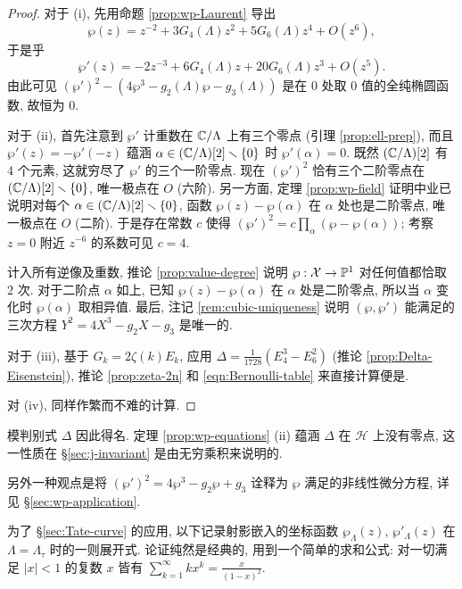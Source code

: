 \begin{proof}
	对于 (i), 先用命题 \ref{prop:wp-Laurent} 导出
	\[ \wp(z) = z^{-2} + 3G_4(\Lambda) z^2 + 5G_6(\Lambda) z^4 + O(z^6), \]
	于是乎
	\[ \wp'(z) = -2z^{-3} + 6 G_4(\Lambda) z + 20 G_6(\Lambda) z^3 + O(z^5). \]
	由此可见 $(\wp')^2 - (4\wp^3 - g_2(\Lambda) \wp - g_3(\Lambda))$ 是在 $0$ 处取 $0$ 值的全纯椭圆函数, 故恒为 $0$.

	对于 (ii), 首先注意到 $\wp'$ 计重数在 $\mathbb{C}/\Lambda$ 上有三个零点 (引理 \ref{prop:ell-prep}), 而且 $\wp'(z) = -\wp'(-z)$ 蕴涵 $\alpha \in (\mathbb{C}/\Lambda)[2] \smallsetminus \{0\}$ 时 $\wp'(\alpha)=0$. 既然 $(\mathbb{C}/\Lambda)[2]$ 有 $4$ 个元素, 这就穷尽了 $\wp'$ 的三个一阶零点. 现在 $(\wp')^2$ 恰有三个二阶零点在 $(\mathbb{C}/\Lambda)[2] \smallsetminus \{0\}$, 唯一极点在 $O$ (六阶). 另一方面, 定理 \ref{prop:wp-field} 证明中业已说明对每个 $\alpha \in (\mathbb{C}/\Lambda)[2] \smallsetminus \{0\}$, 函数 $\wp(z) - \wp(\alpha)$ 在 $\alpha$ 处也是二阶零点, 唯一极点在 $O$ (二阶). 于是存在常数 $c$ 使得 $(\wp')^2 = c\prod_\alpha (\wp - \wp(\alpha))$; 考察 $z=0$ 附近 $z^{-6}$ 的系数可见 $c=4$.

	计入所有逆像及重数, 推论 \ref{prop:value-degree} 说明 $\wp: \mathcal{X} \to \mathbb{P}^1$ 对任何值都恰取 $2$ 次. 对于二阶点 $\alpha$ 如上, 已知 $\wp(z) - \wp(\alpha)$ 在 $\alpha$ 处是二阶零点, 所以当 $\alpha$ 变化时 $\wp(\alpha)$ 取相异值. 最后, 注记 \ref{rem:cubic-uniqueness} 说明 $(\wp,\wp')$ 能满足的三次方程 $Y^2 = 4X^3 - g_2 X - g_3$ 是唯一的.

	对于 (iii), 基于 $G_k = 2\zeta(k) E_k$, 应用 $\Delta = \frac{1}{1728}(E_4^3 - E_6^2)$ (推论 \ref{prop:Delta-Eisenstein}), 推论 \ref{prop:zeta-2n} 和 \eqref{eqn:Bernoulli-table} 来直接计算便是.

	对 (iv), 同样作繁而不难的计算.
\end{proof}

模判别式 $\Delta$ 因此得名. 定理 \ref{prop:wp-equations} (ii) 蕴涵 $\Delta$ 在 $\mathcal{H}$ 上没有零点, 这一性质在 \S\ref{sec:j-invariant} 是由无穷乘积来说明的.

另外一种观点是将 $(\wp')^2 = 4\wp^3 - g_2 \wp + g_3$ 诠释为 $\wp$ 满足的非线性微分方程, 详见 \S\ref{sec:wp-application}.

为了 \S\ref{sec:Tate-curve} 的应用, 以下记录射影嵌入的坐标函数 $\wp_\Lambda(z)$, $\wp'_\Lambda(z)$ 在 $\Lambda = \Lambda_\tau$ 时的一则展开式. 论证纯然是经典的, 用到一个简单的求和公式: 对一切满足 $|x| < 1$ 的复数 $x$ 皆有 $\sum_{k=1}^\infty k x^k = \frac{x}{(1 - x)^2}$.

